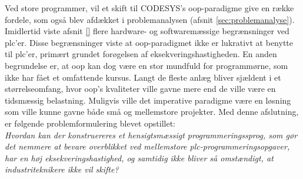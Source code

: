 \noindent Ved store programmer, vil et skift til CODESYS’s \gls{oop}-paradigme give en række fordele, som også blev afdækket i problemanalysen (afsnit \ref{sec:problemanalyse}). Imidlertid viste afsnit \ref{} flere hardware- og softwaremæssige begrænsninger ved \gls{plc}’er. Disse begrænsninger viste at \gls{oop}-paradigmet ikke er lukrativt at benytte til \gls{plc}’er, primært grundet forøgelsen af eksekveringshastigheden. En anden begrundelse er, at \gls{oop} kan dog være en stor mundfuld for programmørne, som ikke har fået et omfattende kursus. Langt de fleste anlæg bliver sjældent i et størrelseomfang, hvor \gls{oop}’s kvaliteter ville gavne mere end de ville være en tidsmæssig belastning. Muligvis ville det imperative paradigme være en løsning som ville kunne gavne både små og mellemstore projekter. Med denne afslutning, er følgende problemformulering blevet opstillet: \\

\noindent\textit{Hvordan kan der konstruereres et hensigtsmæssigt programmeringssprog, som gør det nemmere at bevare overblikket ved mellemstore \gls{plc}-programmeringsopgaver, har en høj eksekveringshastighed, og samtidig ikke bliver så omstændigt, at industriteknikere ikke vil skifte?}





